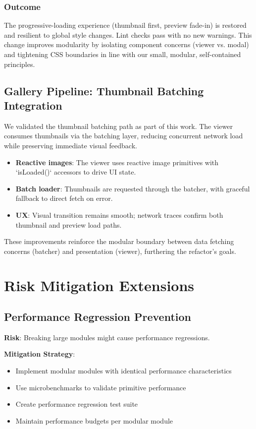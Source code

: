 \documentclass[11pt]{article}
\begin{document}
\subsubsection*{Outcome}
The progressive-loading experience (thumbnail first, preview fade-in) is restored and resilient to global style changes. Lint checks pass with no new warnings. This change improves modularity by isolating component concerns (viewer vs. modal) and tightening CSS boundaries in line with our small, modular, self-contained principles.

\subsection{Gallery Pipeline: Thumbnail Batching Integration}

We validated the thumbnail batching path as part of this work. The viewer consumes thumbnails via the batching layer, reducing concurrent network load while preserving immediate visual feedback.

\begin{itemize}
  \item \textbf{Reactive images}: The viewer uses reactive image primitives with `isLoaded()` accessors to drive UI state.
  \item \textbf{Batch loader}: Thumbnails are requested through the batcher, with graceful fallback to direct fetch on error.
  \item \textbf{UX}: Visual transition remains smooth; network traces confirm both thumbnail and preview load paths.
\end{itemize}

These improvements reinforce the modular boundary between data fetching concerns (batcher) and presentation (viewer), furthering the refactor’s goals.

\section{Risk Mitigation Extensions}

\subsection{Performance Regression Prevention}

\textbf{Risk}: Breaking large modules might cause performance regressions.

\textbf{Mitigation Strategy}:
\begin{itemize}
\item Implement modular modules with identical performance characteristics
\item Use microbenchmarks to validate primitive performance
\item Create performance regression test suite
\item Maintain performance budgets per modular module
\end{itemize}
\end{document}
